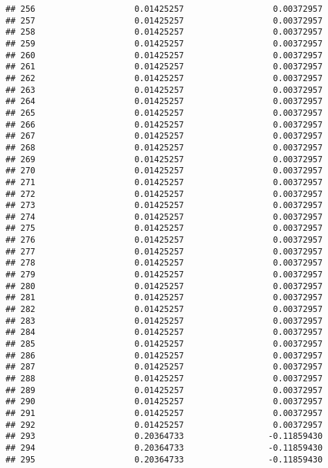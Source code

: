 \documentclass[]{article}
\begin{document}
\begin{verbatim}
## 256                    0.01425257                  0.00372957
## 257                    0.01425257                  0.00372957
## 258                    0.01425257                  0.00372957
## 259                    0.01425257                  0.00372957
## 260                    0.01425257                  0.00372957
## 261                    0.01425257                  0.00372957
## 262                    0.01425257                  0.00372957
## 263                    0.01425257                  0.00372957
## 264                    0.01425257                  0.00372957
## 265                    0.01425257                  0.00372957
## 266                    0.01425257                  0.00372957
## 267                    0.01425257                  0.00372957
## 268                    0.01425257                  0.00372957
## 269                    0.01425257                  0.00372957
## 270                    0.01425257                  0.00372957
## 271                    0.01425257                  0.00372957
## 272                    0.01425257                  0.00372957
## 273                    0.01425257                  0.00372957
## 274                    0.01425257                  0.00372957
## 275                    0.01425257                  0.00372957
## 276                    0.01425257                  0.00372957
## 277                    0.01425257                  0.00372957
## 278                    0.01425257                  0.00372957
## 279                    0.01425257                  0.00372957
## 280                    0.01425257                  0.00372957
## 281                    0.01425257                  0.00372957
## 282                    0.01425257                  0.00372957
## 283                    0.01425257                  0.00372957
## 284                    0.01425257                  0.00372957
## 285                    0.01425257                  0.00372957
## 286                    0.01425257                  0.00372957
## 287                    0.01425257                  0.00372957
## 288                    0.01425257                  0.00372957
## 289                    0.01425257                  0.00372957
## 290                    0.01425257                  0.00372957
## 291                    0.01425257                  0.00372957
## 292                    0.01425257                  0.00372957
## 293                    0.20364733                 -0.11859430
## 294                    0.20364733                 -0.11859430
## 295                    0.20364733                 -0.11859430

\end{verbatim}
\end{document}
